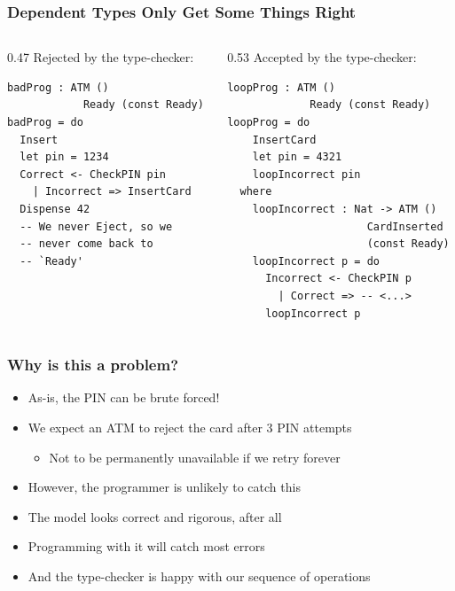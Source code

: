\documentclass[compress,handout]{beamer}
\begin{document}
\begin{frame}[fragile]
  \frametitle{Dependent Types Only Get Some Things Right}

  \begin{columns}
  \begin{column}{0.47\framewidth}
    {\color{red} Rejected by the type-checker:}
    \vspace*{1mm}
    \begin{verbatim}
badProg : ATM ()
            Ready (const Ready)
badProg = do
  Insert
  let pin = 1234
  Correct <- CheckPIN pin
    | Incorrect => InsertCard
  Dispense 42
  -- We never Eject, so we
  -- never come back to
  -- `Ready'
    \end{verbatim}
    \vspace*{2.5mm}
  \end{column}

  \pause  %

  \vrule{}

  \begin{column}{0.53\framewidth}
    {\color{orange} Accepted by the type-checker:}
    \vspace*{1mm}
    \begin{verbatim}
loopProg : ATM ()
             Ready (const Ready)
loopProg = do
    InsertCard
    let pin = 4321
    loopIncorrect pin
  where
    loopIncorrect : Nat -> ATM ()
                      CardInserted
                      (const Ready)
    loopIncorrect p = do
      Incorrect <- CheckPIN p
        | Correct => -- <...>
      loopIncorrect p
    \end{verbatim}
    \vspace*{-6mm}
  \end{column}
  \end{columns}
\end{frame}


\begin{frame}
  \frametitle{Why is this a problem?}

  \begin{itemize}
    \item<1-> As-is, the PIN can be brute forced!
    \item<2-> We expect an ATM to reject the card after 3 PIN attempts
    \begin{itemize}
      \item<2-> Not to be permanently unavailable if we retry forever
    \end{itemize}
    \item<3-> However, the programmer is unlikely to catch this
    \item<4-> The model looks correct and rigorous, after all
    \item<5-> Programming with it will catch most errors
    \item<6-> And the type-checker is happy with our sequence of operations
  \end{itemize}
\end{frame}
\end{document}
